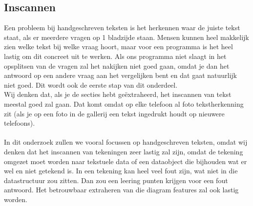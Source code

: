 \documentclass[12pt]{article}
\begin{document}
\subsection{Inscannen}
\begin{multicols}{2}
Een probleem bij handgeschreven teksten is het herkennen waar de juiste tekst staat, als er meerdere vragen op 1 bladzijde staan. Mensen kunnen heel makkelijk zien welke tekst bij welke vraag hoort, maar voor een programma is het heel lastig om dit concreet uit te werken. Als ons programma niet slaagt in het opsplitsen van de vragen zal het nakijken niet goed gaan, omdat je dan het antwoord op een andere vraag aan het vergelijken bent en dat gaat natuurlijk niet goed. Dit wordt ook de eerste stap van dit onderdeel.\\
Wij denken dat, als je de secties hebt geëxtraheerd, het inscannen van tekst meestal goed zal gaan. Dat komt omdat op elke telefoon al foto tekstherkenning zit (als je op een foto in de gallerij een tekst ingedrukt houdt op nieuwere telefoons). 
\\\\
In dit onderzoek zullen we vooral focussen op handgeschreven teksten, omdat wij denken dat het inscannen van tekeningen zeer lastig zal zijn, omdat de tekening omgezet moet worden naar tekstuele data of een dataobject die bijhouden wat er wel en niet getekend is. In een tekening kan heel veel fout zijn, wat niet in die datastructuur zou zitten. Dan zou een leering punten krijgen voor een fout antwoord. Het betrouwbaar extraheren van die diagram features zal ook lastig worden.


\end{multicols}
\end{document}
